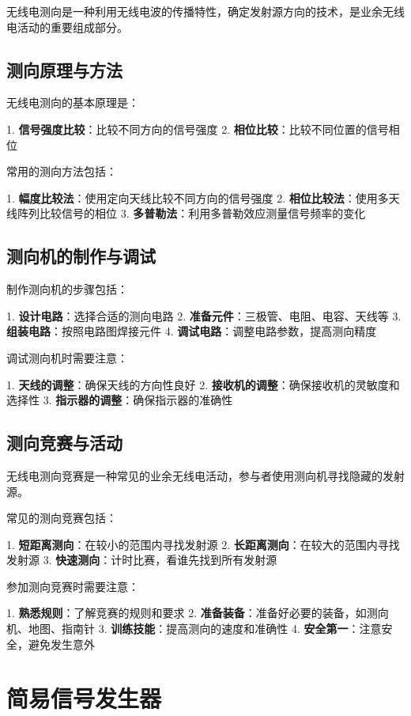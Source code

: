 \documentclass[12pt,UTF8]{ctexbook}
\begin{document}
无线电测向是一种利用无线电波的传播特性，确定发射源方向的技术，是业余无线电活动的重要组成部分。

\section{测向原理与方法}

无线电测向的基本原理是：

1. \textbf{信号强度比较}：比较不同方向的信号强度
2. \textbf{相位比较}：比较不同位置的信号相位

常用的测向方法包括：

1. \textbf{幅度比较法}：使用定向天线比较不同方向的信号强度
2. \textbf{相位比较法}：使用多天线阵列比较信号的相位
3. \textbf{多普勒法}：利用多普勒效应测量信号频率的变化

\section{测向机的制作与调试}

制作测向机的步骤包括：

1. \textbf{设计电路}：选择合适的测向电路
2. \textbf{准备元件}：三极管、电阻、电容、天线等
3. \textbf{组装电路}：按照电路图焊接元件
4. \textbf{调试电路}：调整电路参数，提高测向精度

调试测向机时需要注意：

1. \textbf{天线的调整}：确保天线的方向性良好
2. \textbf{接收机的调整}：确保接收机的灵敏度和选择性
3. \textbf{指示器的调整}：确保指示器的准确性

\section{测向竞赛与活动}

无线电测向竞赛是一种常见的业余无线电活动，参与者使用测向机寻找隐藏的发射源。

常见的测向竞赛包括：

1. \textbf{短距离测向}：在较小的范围内寻找发射源
2. \textbf{长距离测向}：在较大的范围内寻找发射源
3. \textbf{快速测向}：计时比赛，看谁先找到所有发射源

参加测向竞赛时需要注意：

1. \textbf{熟悉规则}：了解竞赛的规则和要求
2. \textbf{准备装备}：准备好必要的装备，如测向机、地图、指南针
3. \textbf{训练技能}：提高测向的速度和准确性
4. \textbf{安全第一}：注意安全，避免发生意外

\chapter{简易信号发生器}
\end{document}
